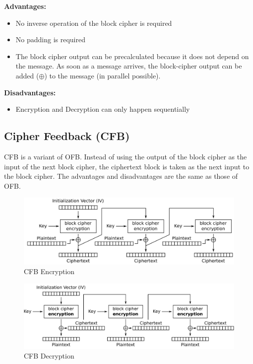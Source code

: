 \textbf{Advantages:}

\begin{itemize}
    \item No inverse operation of the block cipher is required
    \item No padding is required
    \item The block cipher output can be precalculated because it does not depend on the message. As soon as a message arrives, the block-cipher output can be added ($\oplus$) to the message (in parallel possible).
\end{itemize}

\textbf{Disadvantages:}

\begin{itemize}
    \item Encryption and Decryption can only happen sequentially
\end{itemize}

\subsection{Cipher Feedback (CFB)}

CFB is a variant of OFB.
Instead of using the output of the block cipher as the input of the next block cipher, the ciphertext block is taken as the next input to the block cipher.
The advantages and disadvantages are the same as those of OFB.

\begin{figure}[h]
    \center
    \includegraphics[width=\linewidth]{gfx/cfb_enc.png}
    \caption{CFB Encryption}
    \label{fig:cfb_enc}
\end{figure}

\begin{figure}[h]
    \center
    \includegraphics[width=\linewidth]{gfx/cfb_dec.png}
    \caption{CFB Decryption}
    \label{fig:cfb_dec}
\end{figure}

